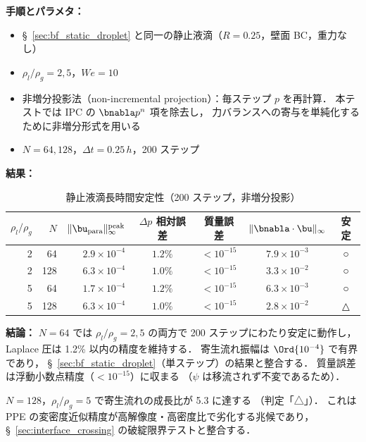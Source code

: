 \noindent\textbf{手順とパラメタ：}
\begin{itemize}[noitemsep]
  \item §~\ref{sec:bf_static_droplet} と同一の静止液滴（$R = 0.25$，壁面 BC，重力なし）
  \item $\rho_l/\rho_g = 2, 5$，$\mathit{We} = 10$
  \item 非増分投影法（non-incremental projection）：毎ステップ $p$ を再計算．
        本テストでは IPC の $\bnabla p^n$ 項を除去し，
        力バランスへの寄与を単純化するために非増分形式を用いる
  \item $N = 64, 128$，$\Delta t = 0.25\,h$，200 ステップ
\end{itemize}

\noindent\textbf{結果：}

\begin{table}[htbp]
\centering
\caption{静止液滴長時間安定性（200 ステップ，非増分投影）}
\label{tab:static_longterm}
\renewcommand{\arraystretch}{1.3}
\begin{tabular}{rrrcccc}
\toprule
$\rho_l/\rho_g$ & $N$ &
$\|\bu_{\mathrm{para}}\|_\infty^{\mathrm{peak}}$ &
$\Delta p$ 相対誤差 & 質量誤差 &
$\|\bnabla\cdot\bu\|_\infty$ & 安定 \\
\midrule
2 &  64 & $2.9 \times 10^{-4}$ & $1.2\%$ & $< 10^{-15}$ & $7.9 \times 10^{-3}$ & ○ \\
2 & 128 & $6.3 \times 10^{-4}$ & $1.0\%$ & $< 10^{-15}$ & $3.3 \times 10^{-2}$ & ○ \\
5 &  64 & $1.7 \times 10^{-4}$ & $1.2\%$ & $< 10^{-15}$ & $6.3 \times 10^{-3}$ & ○ \\
5 & 128 & $6.3 \times 10^{-4}$ & $1.0\%$ & $< 10^{-15}$ & $2.8 \times 10^{-2}$ & △ \\
\bottomrule
\end{tabular}
\end{table}

\noindent\textbf{結論：}
$N = 64$ では $\rho_l/\rho_g = 2, 5$ の両方で 200 ステップにわたり安定に動作し，
Laplace 圧は 1.2\% 以内の精度を維持する．
寄生流れ振幅は $\Ord{10^{-4}}$ で有界であり，
§~\ref{sec:bf_static_droplet}（単ステップ）の結果と整合する．
質量誤差は浮動小数点精度（$< 10^{-15}$）に収まる
（$\psi$ は移流されず不変であるため）．

$N = 128$，$\rho_l/\rho_g = 5$ で寄生流れの成長比が 5.3 に達する
（判定「△」）．
これは PPE の変密度近似精度が高解像度・高密度比で劣化する兆候であり，
§~\ref{sec:interface_crossing} の破綻限界テストと整合する．


